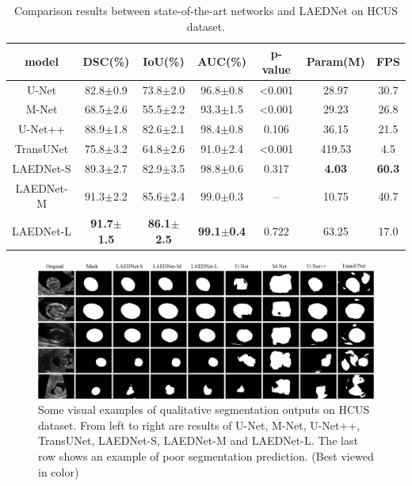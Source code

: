 \documentclass[review]{elsarticle}
\begin{document}
\begin{table}[!t]
	\caption{Comparison results between state-of-the-art networks and LAEDNet on HCUS \cite{2018Automated} dataset.}
	\centering
	\setlength{\tabcolsep}{3.3mm}
	\begin{tabular} {c|ccc|c|cc}
		\hline
		model & DSC(\%) & IoU(\%) & AUC(\%) & p-value &  Param(M) & FPS \\
		\hline
		U-Net \cite{2015U} & 82.8$\pm$0.9 & 73.8$\pm$2.0 & 96.8$\pm$0.8 & \textless0.001 & 28.97 & 30.7 \\
		\hline
		M-Net \cite{2019Deep} &	68.5$\pm$2.6 & 55.5$\pm$2.2 & 93.3$\pm$1.5 & \textless0.001 & 29.23 & 26.8 \\
		\hline
		U-Net++ \cite{2020UNet} & 88.9$\pm$1.8 & 82.6$\pm$2.1 & 98.4$\pm$0.8 & 0.106 & 36.15 & 21.5 \\
		\hline
		TransUNet \cite{chen2021transunet} & 75.8$\pm$3.2 & 64.8$\pm$2.6 & 91.0$\pm$2.4 & \textless0.001 & 419.53 & 4.5 \\
		\hline
		LAEDNet-S & 89.3$\pm$2.7 & 82.9$\pm$3.5 & 98.8$\pm$0.6 & 0.317 & \textbf{4.03} & \textbf{60.3} \\
		\hline
		LAEDNet-M & 91.3$\pm$2.2 & 85.6$\pm$2.4 & 99.0$\pm$0.3 & -- & 10.75 & 40.7 \\
		\hline
		LAEDNet-L & \textbf{91.7$\pm$1.5} & \textbf{86.1$\pm$2.5} & \textbf{99.1$\pm$0.4} & 0.722 & 63.25 & 17.0 \\
		\hline
	\end{tabular}\label{table4}
\end{table}

\begin{figure}[!t]
	\includegraphics[width=\textwidth]{results-HCUS3.png}
	\caption{Some visual examples of qualitative segmentation outputs on HCUS \cite{2018Automated} dataset. From left to right are results of U-Net\cite{2015U}, M-Net\cite{2018Joint}, U-Net++\cite{2020UNet}, TransUNet\cite{chen2021transunet}, LAEDNet-S, LAEDNet-M and LAEDNet-L. The last row shows an example of poor segmentation prediction. (Best viewed in color)}
	\label{fig7}
\end{figure}
\end{document}
